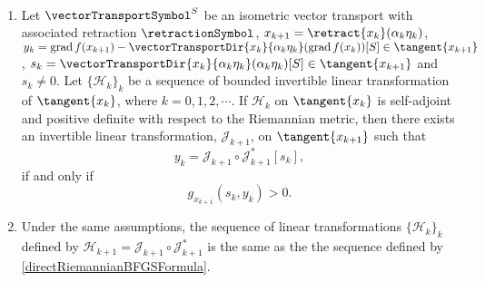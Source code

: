 \begin{lemma}\label{RiemannianPositiveDefiniteUpdate} \ \\[-1.5\baselineskip]
    \begin{enumerate}
        \item Let $\vectorTransportSymbol^S$ be an isometric vector transport with associated retraction $\retractionSymbol$, $x_{k+1} = \retract{x_k}(\alpha_k \eta_k)$, $y_k = \operatorname{grad} f(x_{k+1}) - \vectorTransportDir{x_k}{\alpha_k \eta_k}(\operatorname{grad} f(x_k))[S] \in \tangent{x_{k+1}}$, $s_k =  \vectorTransportDir{x_k}{\alpha_k \eta_k}(\alpha_k \eta_k)[S] \in \tangent{x_{k+1}}$ and $s_k \neq 0$. Let $\{ \mathcal{H}_{k} \}_k$ be a sequence of bounded invertible linear transformation of $\tangent{x_k}$, where $k = 0, 1, 2, \cdots$. If $\mathcal{H}_{k}$ on $\tangent{x_k}$ is self-adjoint and positive definite with respect to the Riemannian metric, then there exists an invertible linear transformation, $\mathcal{J}_{k+1}$, on $\tangent{x_{k+1}}$ such that \begin{equation*} y_k = \mathcal{J}_{k+1} \circ \mathcal{J}^{*}_{k+1} [s_k], \end{equation*} if and only if \begin{equation*} g_{x_{k+1}}(s_k, y_k) > 0. \end{equation*}        
        \item Under the same assumptions, the sequence of linear transformations $\{ \mathcal{H}_{k} \}_k$ defined by $\mathcal{H}_{k+1} = \mathcal{J}_{k+1} \circ \mathcal{J}^{*}_{k+1}$ is the same as the the sequence defined by \cref{directRiemannianBFGSFormula}.
    \end{enumerate}
\end{lemma}

